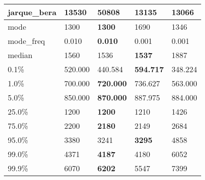 \begin{table}[H]
\begin{tabular}{|l|m{10em}|m{10em}|m{10em}|m{10em}|}
\hline jarque\_bera & 13530 & \cellcolor[rgb]{0.9, 0.54, 0.52} 50808 & \bfseries 13135 & 13066 \\
\hline mode & 1300 & \bfseries 1300 & \cellcolor[rgb]{0.9, 0.54, 0.52} 1690 & 1346 \\
\hline mode\_freq & 0.010 & \bfseries 0.010 & \cellcolor[rgb]{0.9, 0.54, 0.52} 0.001 & 0.001 \\
\hline median & 1560 & 1536 & \bfseries 1537 & \cellcolor[rgb]{0.9, 0.54, 0.52} 1887 \\
\hline 0.1\% & 520.000 & 440.584 & \bfseries 594.717 & \cellcolor[rgb]{0.9, 0.54, 0.52} 348.224 \\
\hline 1.0\% & 700.000 & \bfseries 720.000 & 736.627 & \cellcolor[rgb]{0.9, 0.54, 0.52} 563.000 \\
\hline 5.0\% & 850.000 & \bfseries 870.000 & \cellcolor[rgb]{0.9, 0.54, 0.52} 887.975 & 884.000 \\
\hline 25.0\% & 1200 & \bfseries 1200 & 1210 & \cellcolor[rgb]{0.9, 0.54, 0.52} 1426 \\
\hline 75.0\% & 2200 & \bfseries 2180 & 2149 & \cellcolor[rgb]{0.9, 0.54, 0.52} 2684 \\
\hline 95.0\% & 3380 & 3241 & \bfseries 3295 & \cellcolor[rgb]{0.9, 0.54, 0.52} 4858 \\
\hline 99.0\% & 4371 & \bfseries 4187 & 4180 & \cellcolor[rgb]{0.9, 0.54, 0.52} 6052 \\
\hline 99.9\% & 6070 & \bfseries 6202 & 5547 & \cellcolor[rgb]{0.9, 0.54, 0.52} 7399 \\
\hline
\end{tabular}
\end{table}
